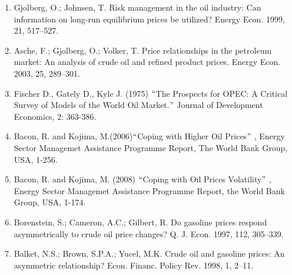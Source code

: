 \documentclass[12pt,twoside]{article}
\begin{document}
\begin{enumerate}
	\item {\fontsize{9pt}{10.8pt}\selectfont Gjolberg, O.; Johnsen, T. Risk management in the oil industry: Can information on long-run equilibrium prices be utilized? Energy Econ. 1999, 21, 517–527.\par}\par

	\item {\fontsize{9pt}{10.8pt}\selectfont Asche, F.; Gjolberg, O.; Volker, T. Price relationships in the petroleum market: An analysis of crude oil and refined product prices. Energy Econ. 2003, 25, 289–301.\par}\par

	\item {\fontsize{9pt}{10.8pt}\selectfont Fischer D., Gately D., Kyle J. (1975) $``$The Prospects for OPEC: A Critical Survey of Models of the World Oil Market.$"$  Journal of Development Economics, 2: 363-386.\par}\par

	\item {\fontsize{9pt}{10.8pt}\selectfont Bacon, R. and Kojima, M.(2006)$``$Coping with Higher Oil Prices$"$ , Energy Sector Managemet Assistance Programme Report, The World Bank Group, USA, 1-256.\par}\par

	\item {\fontsize{9pt}{10.8pt}\selectfont Bacon, R. and Kojima, M. (2008) $``$Coping with Oil Prices Volatility$"$ , Energy Sector Managemet Assistance Programme Report, the World Bank Group, USA, 1-174.\par}\par

	\item {\fontsize{9pt}{10.8pt}\selectfont Borenstein, S.; Cameron, A.C.; Gilbert, R. Do gasoline prices respond asymmetrically to crude oil price changes? Q. J. Econ. 1997, 112, 305–339.\par}\par

	\item {\fontsize{9pt}{10.8pt}\selectfont Balket, N.S.; Brown, S.P.A.; Yucel, M.K. Crude oil and gasoline prices: An asymmetric relationship? Econ. Financ. Policy Rev. 1998, 1, 2–11.\par}\par


\end{enumerate}
\end{document}
